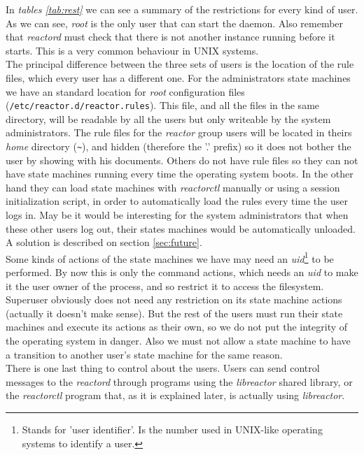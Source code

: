 In \emph{tables \ref{tab:rest}} we can see a summary of the restrictions for every kind of user. As we can see, \emph{root} is the only
user that can start the daemon. Also remember that \emph{reactord} must check that there is not another instance running before it starts.
This is a very common behaviour in UNIX systems.\\
The principal difference between the three sets of users is the location of the rule files, which every user has a different one. For the 
administrators state machines we have an standard location for \emph{root} configuration files (\texttt{/etc/reactor.d/reactor.rules}).
This file, and all the files in the same directory, will be readable by all the users but only writeable by the system administrators.
The rule files for the \emph{reactor} group users will be located in theirs \emph{home} directory (\texttt{\~{}}), and hidden (therefore 
the '.' prefix) so it does not bother the user by showing with his documents. Others do not have rule files so they can not have state 
machines running every time the operating system boots. In the other hand they can load state machines with \emph{reactorctl} manually or 
using a session initialization script, in order to automatically load the rules every time the user logs in. May be it would be interesting
for the system administrators that when these other users log out, their states machines would be automatically unloaded. A solution is 
described on section \ref{sec:future}.\\
Some kinds of actions of the state machines we have may need an \emph{uid}\footnote{Stands for 'user identifier'. Is the number used in 
UNIX-like operating systems to identify a user.} to be performed. By now this is only the command actions, which needs an \emph{uid} to 
make it the user owner of the process, and so restrict it to access the filesystem. Superuser obviously does not need any restriction on
its state machine actions (actually it doesn't make sense). But the rest of the users must run their state machines and execute its 
actions as their own, so we do not put the integrity of the operating system in danger. Also we must not allow a state machine to have
a transition to another user's state machine for the same reason.\\
There is one last thing to control about the users. Users can send control messages to the \emph{reactord} through programs using the 
\emph{libreactor} shared library, or the \emph{reactorctl} program that, as it is explained later, is actually using \emph{libreactor}. 
